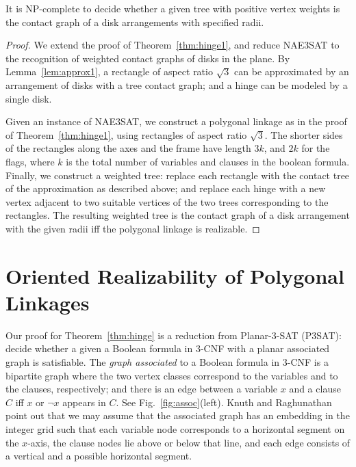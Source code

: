 \documentclass{llncs}
\begin{document}
\begin{theorem}\label{thm:disk1}
It is NP-complete to decide whether a given tree with positive vertex weights
is the contact graph of a disk arrangements with specified radii.
\end{theorem}
\begin{proof}
We extend the proof of Theorem~\ref{thm:hinge1}, and reduce NAE3SAT to the recognition of weighted contact graphs of disks in the plane. By Lemma~\ref{lem:approx1}, a rectangle of aspect ratio $\sqrt{3}$ can be approximated by an arrangement of disks with a tree contact graph; and a hinge can be modeled by a single disk.

Given an instance of NAE3SAT, we construct a polygonal linkage as in the proof of Theorem~\ref{thm:hinge1}, using rectangles of aspect ratio $\sqrt{3}$. The shorter sides of the rectangles along the axes and the frame have length $3k$, and $2k$ for the flags, where $k$ is the total number of variables and clauses in the boolean formula. Finally, we construct a weighted tree: replace each rectangle with the contact tree of the approximation as described above; and replace each hinge with a new vertex adjacent to
two suitable vertices of the two trees corresponding to the rectangles. The resulting weighted tree is the contact graph of a disk arrangement with the given radii iff the polygonal linkage is realizable.
\end{proof}


\section{Oriented Realizability of Polygonal Linkages\label{sec:hinge}}

Our proof for Theorem~\ref{thm:hinge} is a reduction from {\sc Planar-3-SAT} (P3SAT): decide whether a given a Boolean formula in 3-CNF with a planar associated graph is satisfiable. The \emph{graph associated} to a Boolean formula in 3-CNF is a bipartite graph where the two vertex classes correspond to the variables and to the clauses, respectively; and there is an edge between a variable $x$ and a clause $C$ iff $x$ or $\neg x$ appears in $C$. See Fig.~\ref{fig:assoc}(left).
Knuth and Raghunathan~\cite{KR92} point out that we may assume that the associated graph has an
embedding in the integer grid such that each variable node corresponds to a horizontal segment on
the $x$-axis, the clause nodes lie above or below that line, and each edge consists of a vertical and a possible horizontal segment.
\end{document}
